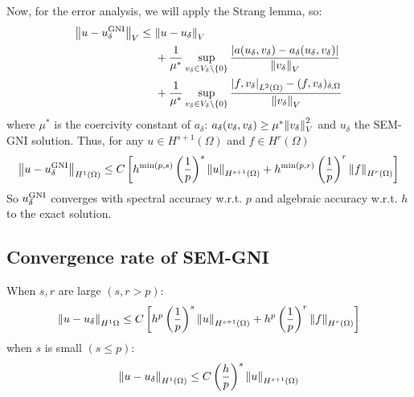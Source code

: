 Now, for the error analysis, we will apply the Strang lemma, so:
\begin{align*}
    \norm{u- u _\delta^{\text{GNI}}}_V \leq \ & \norm{u-u_\delta}_V \\
    & + \frac{1}{\mu^*} \sup_{v_\delta \in V_\delta \backslash\left\{ 0 \right\}} \frac{\abs{a(u_\delta, v_\delta) - a_\delta(u_\delta, v_\delta)}}{\norm{v_\delta}_V} \\
    & + \frac{1}{\mu^*} \sup_{v_\delta \in V_\delta \backslash\left\{ 0 \right\}} \frac{\abs{f,v_\delta}_{L^2(\Omega)} - (f,v_\delta)_{\delta,\Omega}}{\norm{v_\delta}_V}
\end{align*}
where \(\mu^*\) is the coercivity constant of \(a_\delta\): \(a_\delta(v_\delta, v_\delta) \geq \mu^*\norm{v_\delta}^2_V\) and \(u_\delta\) the SEM-GNI solution.
Thus, for any \(u \in H^{s+1}(\Omega)\) and \(f \in H^r(\Omega)\) 
\[
    \norm{u-u_\delta^{\text{GNI}}}_{H^1(\Omega)} \leq C\left[ h^{\min(p,s)}\left( \frac{1}{p} \right)^s \norm{u}_{H^{s+1}(\Omega)} + h^{\min(p,r)}\left( \frac{1}{p} \right)^r \norm{f}_{H^{r}(\Omega)}  \right]
\]
So \(u_\delta^{\text{GNI}}\) converges with spectral accuracy w.r.t. \(p\) and algebraic accuracy w.r.t. \(h\) to the exact solution.
\subsection{Convergence rate of SEM-GNI}
When \(s,r\) are large \((s, r > p)\):
\[
    \norm{u-u_\delta}_{H^1{\Omega}} \leq C \left[ h^p \left(\frac{1}{p}\right)^s \norm{u}_{H^{s+1}(\Omega)} + h^p \left(\frac{1}{p}\right)^r \norm{f}_{H^{r}(\Omega)}  \right]
\]
when \(s\) is small \((s \leq p)\):
\[
    \norm{u-u_\delta}_{H^1(\Omega)} \leq C\left( \frac{h}{p} \right)^s \norm{u}_{H^{s+1}(\Omega)}
\]

